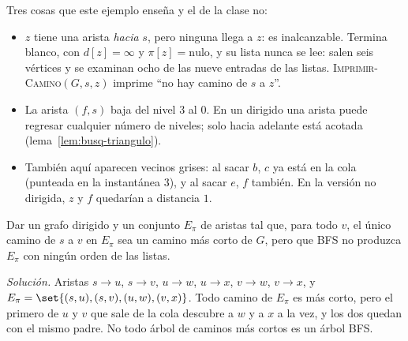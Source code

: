 \documentclass[11pt,letterpaper]{article}
\begin{document}
\begin{ejemplo}
\begin{center}
  \end{center}
  Tres cosas que este ejemplo enseña y el de la clase no:
  \begin{itemize}[itemsep=0.1em]
    \item $z$ tiene una arista \textit{hacia} $s$, pero ninguna llega
      a $z$: es inalcanzable. Termina blanco, con $d[z] = \infty$ y
      $\pi[z] = \text{nulo}$, y su lista nunca se lee: salen seis
      vértices y se examinan ocho de las nueve entradas de las
      listas. \textsc{Imprimir-Camino}$(G, s, z)$ imprime ``no hay
      camino de $s$ a $z$''.
    \item La arista $(f, s)$ baja del nivel $3$ al $0$. En un dirigido
      una arista puede regresar cualquier número de niveles; solo
      hacia adelante está acotada (lema~\ref{lem:busq-triangulo}).
    \item También aquí aparecen vecinos grises: al sacar $b$, $c$ ya
      está en la cola (punteada en la instantánea 3), y al sacar $e$,
      $f$ también. En la versión no dirigida, $z$ y $f$ quedarían a
      distancia $1$.
  \end{itemize}
\end{ejemplo}

\begin{ejercicio}
  Dar un grafo dirigido y un conjunto $E_\pi$ de aristas tal que, para
  todo $v$, el único camino de $s$ a $v$ en $E_\pi$ sea un camino más
  corto de $G$, pero que BFS no produzca $E_\pi$ con ningún orden de
  las listas.

  \textit{Solución.} Aristas $s \to u$, $s \to v$, $u \to w$,
  $u \to x$, $v \to w$, $v \to x$, y
  $E_\pi = \set{(s,u), (s,v), (u,w), (v,x)}$. Todo camino de $E_\pi$
  es más corto, pero el primero de $u$ y $v$ que sale de la cola
  descubre a $w$ y a $x$ a la vez, y los dos quedan con el mismo
  padre. No todo árbol de caminos más cortos es un árbol BFS.
\end{ejercicio}
\end{document}
